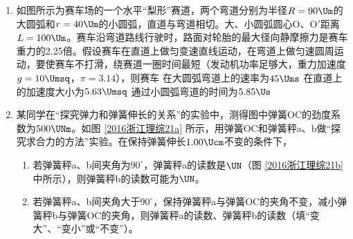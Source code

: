 \documentclass[\gkver]{gaokaozhenti}
\begin{document}
\begin{enumerate}
{
}

\item
如图所示为赛车场的一个水平“梨形”赛道，两个弯道分别为半径$R=90\Um$的大圆弧和$r=40\Um$的小圆弧，直道与弯道相切。大、小圆弧圆心O、O$'$距离$L=100\Um$。赛车沿弯道路线行驶时，路面对轮胎的最大径向静摩擦力是赛车重力的2.25倍。假设赛车在直道上做匀变速直线运动，在弯道上做匀速圆周运动，要使赛车不打滑，绕赛道一圈时间最短（发动机功率足够大，重力加速度$g=10\Umsq$，$\pi=3.14$），则赛车
\onepicture[w=4.64cm]{}
{在大圆弧弯道上的速率为$45\Ums$}
{在直道上的加速度大小为$5.63\Umsq$}
{通过小圆弧弯道的时间为$5.85\Us$}

\item
某同学在“探究弹力和弹簧伸长的关系”的实验中，测得图中弹簧OC的劲度系数为$500\UNm$。如图 \ref{2016浙江理综21a} 所示，用弹簧OC和弹簧秤a、b做“探究求合力的方法”实验。在保持弹簧伸长$1.00\Ucm$不变的条件下，
\begin{enumerate}
	\item
	若弹簧秤a、b间夹角为$90^\circ$，弹簧秤a的读数是$\UN$（图 \ref{2016浙江理综21b} 中所示），则弹簧秤b的读数可能为$\UN$。

	\item
	若弹簧秤a、b间夹角大于$90^\circ$，保持弹簧秤a与弹簧OC的夹角不变，减小弹簧秤b与弹簧OC的夹角，则弹簧秤a的读数、弹簧秤b的读数（填“变大”、“变小”或“不变”）。


\end{enumerate}
\end{enumerate}
\end{document}
